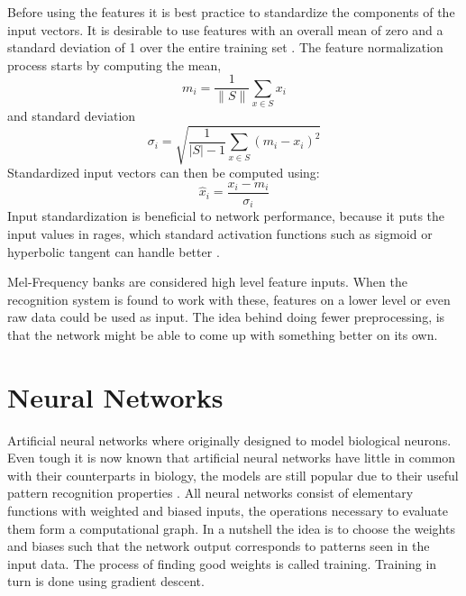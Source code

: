Before using the features it is best practice to standardize the components of the input vectors. It is desirable to use features with an overall mean of zero and a standard deviation of 1 over the entire training set \cite[page 30]{Graves2008}. The feature normalization process starts by computing the mean,
\begin{equation}
m_i = \frac{1}{\|S\|} \sum\limits_{x \in S} x_i
\end{equation}
and standard deviation
\begin{equation}
\sigma_i = \sqrt{\frac{1}{|S| - 1}\sum\limits_{x \in S}(m_i - x_i)^2}
\end{equation}
Standardized input vectors can then be computed using:
\begin{equation}
\hat{x}_i = \frac{x_i - m_i}{\sigma_i}
\end{equation}
Input standardization is beneficial to network performance, because it puts the input values in rages, which standard activation functions such as sigmoid or hyperbolic tangent can handle better \cite[page 30]{Graves2008}.

Mel-Frequency banks are considered high level feature inputs. When the recognition system is found to work with these, features on a lower level or even raw data could be used as input. The idea behind doing fewer preprocessing, is that the network might be able to come up with something better on its own.

\section{Neural Networks}
Artificial neural networks where originally designed to model biological neurons. Even tough it is now known that artificial neural networks have little in common with their counterparts in biology, the models are still popular due to their useful pattern recognition properties \cite[page 13]{Graves}. All neural networks consist of elementary functions with weighted and biased inputs, the operations necessary to evaluate them form a computational graph. In a nutshell the idea is to choose the weights and biases such that the network output corresponds to patterns seen in the input data. The process of finding good weights is called training. Training in turn is done using gradient descent.

